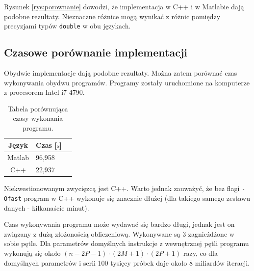 Rysunek \ref{rys:porownanie} dowodzi, że implementacja w C++ i w Matlabie dają podobne rezultaty. Nieznaczne różnice mogą wynikać z różnic pomiędzy precyzjami typów \texttt{double} w obu językach.

\subsection{Czasowe porównanie implementacji}

Obydwie implementacje dają podobne rezultaty. Można zatem porównać czas wykonywania obydwu programów. Programy zostały uruchomione na komputerze z procesorem Intel i7 4790.
\begin{table}[!htb]
	\centering
	\caption{Tabela porównująca czasy wykonania programu.}
	\begin{tabular}{|c|l|l|}
		\hline
		Język & Czas [$\mathrm{s}$] \\
		\hline
		Matlab & 96,958 \\
		\hline
		C++ & 22,937 \\
		\hline
	\end{tabular}
	\label{tab:tabela2}
\end{table}

Niekwestionowanym zwycięzcą jest C++. Warto jednak zauważyć, że bez flagi \texttt{-Ofast} program w C++ wykonuje się znacznie dłużej (dla takiego samego zestawu danych - kilkanaście minut).

Czas wykonywania programu może wydawać się bardzo długi, jednak jest on związany z dużą złożonością obliczeniową. Wykonywane są 3 zagnieżdżone w sobie pętle. Dla parametrów domyślnych instrukcje z wewnętrznej pętli programu wykonują się około $(n-2P-1)\cdot(2M+1)\cdot(2P+1)$ razy, co dla domyślnych parametrów i serii 100 tysięcy próbek daje około 8 miliardów iteracji.